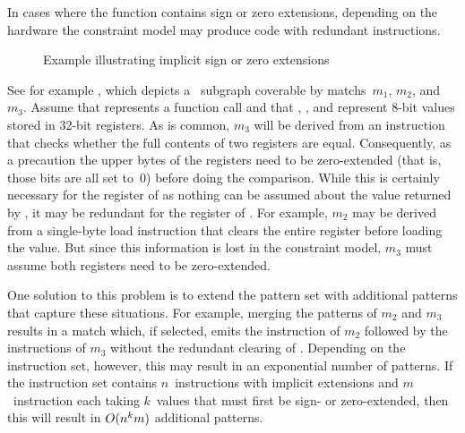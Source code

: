 In cases where the \gls{function} contains sign or zero extensions, depending on
the hardware the \gls{constraint model} may produce code with redundant
\glspl{instruction}.
%
\begin{figure}
  \centering%
  

  \caption{Example illustrating implicit sign or zero extensions}%
\end{figure}
%
See for example , which depicts a
~\gls{subgraph} coverable by \glspl{match}~$m_1$, $m_2$,
and~$m_3$.
%
Assume that  represents a \gls{function} call and that ,
, and  represent 8-bit values stored in 32-bit
\glspl{register}.
%
As is common, $m_3$ will be derived from an \gls{instruction} that checks
whether the full contents of two \glspl{register} are equal.
%
Consequently, as a precaution the upper bytes of the \glspl{register} need to be
zero-extended (that is, those bits are all set to~0) before doing the
comparison.
%
While this is certainly necessary for the \gls{register} of  as
nothing can be assumed about the value returned by , it may be
redundant for the register of .
%
For example, $m_2$ may be derived from a single-byte load \gls{instruction} that
clears the entire \gls{register} before loading the value.
%
But since this information is lost in the \gls{constraint model}, $m_3$ must
assume both \glspl{register} need to be zero-extended.

One solution to this problem is to extend the \gls{pattern set} with additional
\glspl{pattern} that capture these situations.
%
For example, merging the \glspl{pattern} of $m_2$ and $m_3$ results in a
\gls{match} which, if selected, emits the \gls{instruction} of $m_2$ followed by
the \glspl{instruction} of $m_3$ without the redundant clearing of .
%
Depending on the \gls{instruction set}, however, this may result in an
exponential number of \glspl{pattern}.
%
If the \gls{instruction set} contains $n$~\glspl{instruction} with implicit
extensions and $m$~\gls{instruction} each taking $k$~values that must first be
sign- or zero-extended, then this will result in $O(n^k m)$ additional
\glspl{pattern}.

